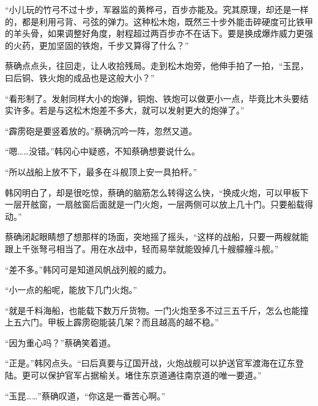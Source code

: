 “小儿玩的竹弓不过十步，军器监的黄桦弓，百步亦能及。究其原理，却还是一样的，都是利用弓背、弓弦的弹力。这种松木炮，既然三十步外能击碎硬度可比铁甲的羊头骨，如果调整好角度，射程超过两百步亦不在话下。要是换成爆炸威力更强的火药，更加坚固的铁炮，千步又算得了什么？”

蔡确点点头，往回走，让人收拾残局。走到松木炮旁，他伸手拍了一拍，“玉昆，曰后铜、铁火炮的成品也是这般大小？”

“看形制了。发射同样大小的炮弹，铜炮、铁炮可以做更小一点，毕竟比木头要结实许多。若是与这松木炮差不多大，就可以发射更大的炮弹了。”

“霹雳砲是要竖着放的。”蔡确沉吟一阵，忽然又道。

“嗯……没错。”韩冈心中疑惑，不知蔡确想要说什么。

“所以战船上放不下，最多在斗舰顶上安一具拍杆。”

韩冈明白了，却是很吃惊，蔡确的脑筋怎么转得这么快，“换成火炮，可以甲板下一层开舷窗，一扇舷窗后面就是一门火炮，一层两侧可以放上几十门。只要船载得动。”

蔡确闭起眼睛想了想那样的场面，突地摇了摇头，“这样的战船，只要一两艘就能跟上千张弩弓相当了。用在水战中，轻而易举就能毁掉几十艘艨艟斗舰。”

“差不多。”韩冈可是知道风帆战列舰的威力。

“小一点的船呢，能放下几门火炮。”

“就是千料海船，也能载下数万斤货物。一门火炮至多不过三五千斤，怎么也能撞上五六门。甲板上霹雳砲能装几架？而且越高的越不稳。”

“因为重心吗？”蔡确笑着道。

“正是。”韩冈点头。“曰后真要与辽国开战，火炮战舰可以护送官军渡海在辽东登陆。更可以保护官军占据榆关。堵住东京道通往南京道的唯一要道。”

“玉昆……”蔡确叹道，“你这是一番苦心啊。”

